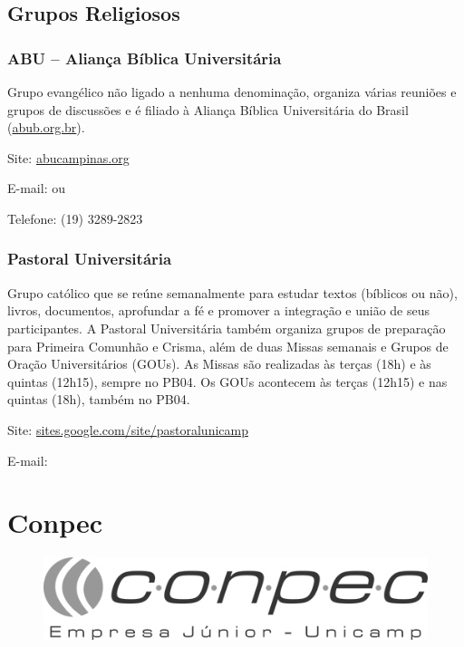 \subsection{Grupos Religiosos}

\subsubsection{ABU -- Aliança Bíblica Universitária}

Grupo evangélico não ligado a nenhuma denominação, organiza várias reuniões
e grupos de discussões e é filiado à Aliança Bíblica Universitária do Brasil
(\url{abub.org.br}).

\begin{compactitemize}
\item Site: \url{abucampinas.org}
\item E-mail:  ou
\item Telefone: (19) 3289-2823
\end{compactitemize}

\subsubsection{Pastoral Universitária}

Grupo católico que se reúne semanalmente para estudar textos (bíblicos ou não),
livros, documentos, aprofundar a fé e promover a integração e união de seus
participantes. A Pastoral Universitária também organiza grupos de preparação
para Primeira Comunhão e Crisma, além de duas Missas semanais e Grupos de Oração
Universitários (GOUs). As Missas são realizadas às terças (18h) e às
quintas (12h15), sempre no PB04. Os GOUs acontecem às terças (12h15) e
nas quintas (18h), também no PB04.

\begin{compactitemize}
\item Site: \url{sites.google.com/site/pastoralunicamp}
\item E-mail: 
\end{compactitemize}

\newpage
\section{Conpec}

\begin{figure}[H]
    \centering
    \includegraphics[scale=0.40]{img/conpec.png}
\end{figure}

